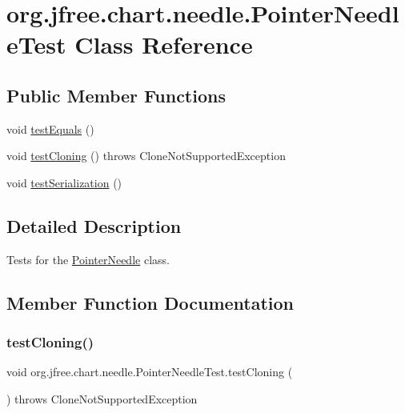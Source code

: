 \hypertarget{classorg_1_1jfree_1_1chart_1_1needle_1_1_pointer_needle_test}{}\section{org.\+jfree.\+chart.\+needle.\+Pointer\+Needle\+Test Class Reference}
\label{classorg_1_1jfree_1_1chart_1_1needle_1_1_pointer_needle_test}
\subsection*{Public Member Functions}
\begin{DoxyCompactItemize}
\item 
void \mbox{\hyperlink{classorg_1_1jfree_1_1chart_1_1needle_1_1_pointer_needle_test_a8290cdaaaadeeefa5f9089b14c2d117c}{test\+Equals}} ()
\item 
void \mbox{\hyperlink{classorg_1_1jfree_1_1chart_1_1needle_1_1_pointer_needle_test_a33cf5d98ceae3b393bed1a88d3f39cdd}{test\+Cloning}} ()  throws Clone\+Not\+Supported\+Exception 
\item 
void \mbox{\hyperlink{classorg_1_1jfree_1_1chart_1_1needle_1_1_pointer_needle_test_a7771d5cb145ff7aec113fbe96cabb08c}{test\+Serialization}} ()
\end{DoxyCompactItemize}


\subsection{Detailed Description}
Tests for the \mbox{\hyperlink{classorg_1_1jfree_1_1chart_1_1needle_1_1_pointer_needle}{Pointer\+Needle}} class. 

\subsection{Member Function Documentation}
\mbox{\label{classorg_1_1jfree_1_1chart_1_1needle_1_1_pointer_needle_test_a33cf5d98ceae3b393bed1a88d3f39cdd}} 
\subsubsection{\texorpdfstring{test\+Cloning()}{testCloning()}}
{\footnotesize\ttfamily void org.\+jfree.\+chart.\+needle.\+Pointer\+Needle\+Test.\+test\+Cloning (\begin{DoxyParamCaption}{ }\end{DoxyParamCaption}) throws Clone\+Not\+Supported\+Exception}

